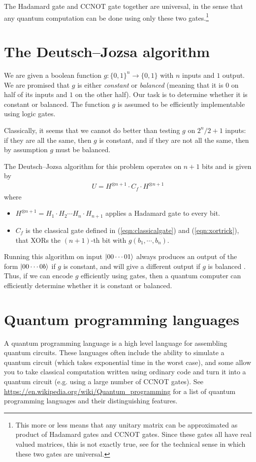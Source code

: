 \documentclass[a4paper, 11pt]{article}
\theoremstyle{definition}
\begin{document}
The Hadamard gate and CCNOT gate together are universal, in the sense that any quantum computation can be done using only these two gates.\footnote{This more or less means that any unitary matrix can be approximated as product of Hadamard gates and CCNOT gates.
Since these gates all have real valued matrices, this is not exactly true, see \cite{aharonovSimpleProofThat2003} for the technical sense in which these two gates are universal.}

\section{The Deutsch–Jozsa algorithm}

We are given a boolean function $g : \{0,1\}^n \to \{0,1\}$ with $n$ inputs and $1$ output.
We are promised that $g$ is either \emph{constant} or \emph{balanced} (meaning that it is $0$ on half of its inputs and $1$ on the other half).
Our task is to determine whether it is constant or balanced.
The function $g$ is assumed to be efficiently implementable using logic gates.

Classically, it seems that we cannot do better than testing $g$ on $2^n/2+ 1$ inputs:
if they are all the same, then $g$ is constant, and if they are not all the same, then by assumption $g$ must be balanced.

The Deutsch–Jozsa algorithm for this problem operates on $n+1$ bits and is given by
\begin{align*}
  U = H^{\otimes n+1} \cdot C_f \cdot H^{\otimes n+1}
\end{align*}
where
\begin{itemize}
  \item $H^{\otimes n+1} = H_1 \cdot H_2 \cdots H_n \cdot H_{n+1}$ applies a Hadamard gate to every bit.
  \item $C_f$ is the classical gate defined in (\ref{eqn:classicalgate}) and (\ref{eqn:xortrick}), that XORs the $(n+1)$-th bit with $g(b_1,\cdots,b_{n})$.
\end{itemize}

Running this algorithm on input $\ket{00\cdots01}$ always produces an output of the form $\ket{00\cdots0b}$ if $g$ is constant,
and will give a different output if $g$ is balanced \cite{DeutschJozsaAlgorithm2021}.
Thus, if we can encode $g$ efficiently using gates, then a quantum computer can efficiently determine whether it is constant or balanced.

\section{Quantum programming languages}

A quantum programming language is a high level language for assembling quantum circuits.
These languages often include the ability to simulate a quantum circuit (which takes exponential time in the worst case),
and some allow you to take classical computation written using ordinary code and turn it into a quantum circuit (e.g. using a large number of CCNOT gates).
See \url{https://en.wikipedia.org/wiki/Quantum_programming} for a list of quantum programming languages and their distinguishing features.



\end{document}
